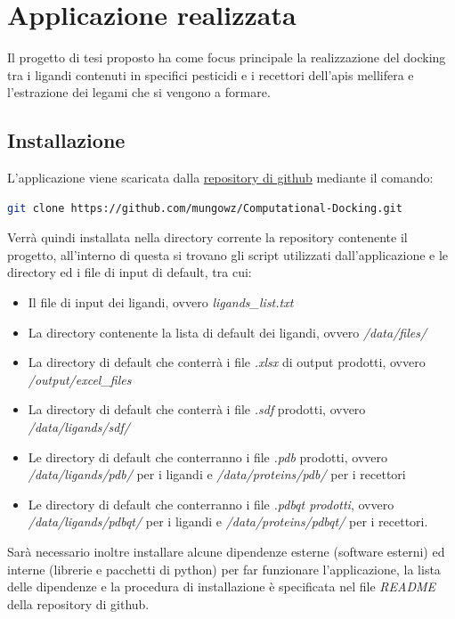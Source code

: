 \chapter{Applicazione realizzata}
Il progetto di tesi proposto ha come focus principale la realizzazione del docking tra i ligandi contenuti in specifici pesticidi e i recettori dell'apis mellifera e l'estrazione dei legami che si vengono a formare. 

\section{Installazione}
L'applicazione viene scaricata dalla \href{https://github.com/mungowz/Computational-Docking.git}{repository di github} mediante il comando:

\begin{lstlisting}[language=Bash, label=lst:code1, caption={Comando per scaricare la repository}]
git clone https://github.com/mungowz/Computational-Docking.git
\end{lstlisting}

Verrà quindi installata nella directory corrente la repository contenente il progetto, all'interno di questa si trovano gli script utilizzati dall'applicazione e le directory ed i file di input di default, tra cui:

\begin{itemize}
    \item Il file di input dei ligandi, ovvero \textit{ligands\_list.txt}
    \item La directory contenente la lista di default dei ligandi, ovvero \textit{/data/files/}
    \item La directory di default che conterrà i file \textit{.xlsx} di output prodotti, ovvero \textit{/output/excel\_files}
    \item La directory di default che conterrà i file \textit{.sdf} prodotti, ovvero \textit{/data/ligands/sdf/}
    \item Le directory di default che conterranno i file \textit{.pdb} prodotti, ovvero \textit{/data/ligands/pdb/} per i ligandi e \textit{/data/proteins/pdb/} per i recettori
    \item Le directory di default che conterranno i file \textit{.pdbqt prodotti}, ovvero \textit{/data/ligands/pdbqt/} per i ligandi e \textit{/data/proteins/pdbqt/} per i recettori.
\end{itemize}

Sarà necessario inoltre installare alcune dipendenze esterne (software esterni) ed interne (librerie e pacchetti di python) per far funzionare l'applicazione, la lista delle dipendenze e la procedura di installazione è specificata nel file \textit{README} della repository di github.

